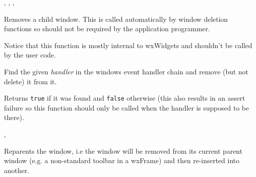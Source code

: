 
,
,
,


\label{wxwindowremovechild}


Removes a child window.  This is called automatically by window deletion
functions so should not be required by the application programmer.

Notice that this function is mostly internal to wxWidgets and shouldn't be
called by the user code.




\label{wxwindowremoveeventhandler}


Find the given {\it handler} in the windows event handler chain and remove (but
not delete) it from it.




Returns {\tt true} if it was found and {\tt false} otherwise (this also results
in an assert failure so this function should only be called when the
handler is supposed to be there).


,\rtfsp
{}


\label{wxwindowreparent}


Reparents the window, i.e the window will be removed from its
current parent window (e.g. a non-standard toolbar in a wxFrame)
and then re-inserted into another.



